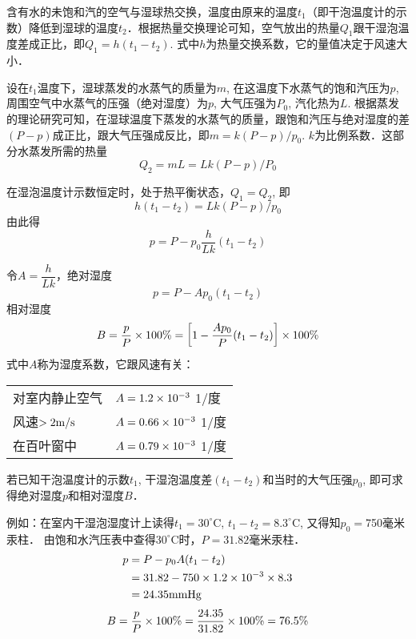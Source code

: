 含有水的未饱和汽的空气与湿球热交换，温度由原来的温度$t_1$（即干泡温度计的示数）降低到湿球的温度$t_2$．根据热量交换理论可知，空气放出的热量$Q_1$跟干湿泡温度差成正比，即$Q_1=h(t_1-t_2)$. 式中$h$为热量交换系数，它的量值决定于风速大小．

设在$t_1$温度下，湿球蒸发的水蒸气的质量为$m$, 在这温度下水蒸气的饱和汽压为$p$, 周围空气中水蒸气的压强（绝对湿度）为$p$, 大气压强为$P_0$, 汽化热为$L$. 根据蒸发的理论研究可知，在湿球温度下蒸发的水蒸气的质量，跟饱和汽压与绝对湿度的差$(P-p)$成正比，跟大气压强成反比，即$m=k(P-p)/p_0$. $k$为比例系数．这部分水蒸发所需的热量
\[Q_2=mL=Lk (P-p) /P_0\]

在湿泡温度计示数恒定时，处于热平衡状态，$Q_1=Q_2$, 即
\[h (t_1-t_2) =Lk (P-p) /p_0\]
由此得
\[p=P-p_0 \frac{h}{Lk} (t_1-t_2) \]

令$A=\dfrac{h}{Lk}$，绝对湿度
\[p=P-Ap_0(t_1-t_2)\]
相对湿度
\[B=\frac{p}{P}\times 100\%=\left[1-\frac{Ap_0}{P}(t_1-t_2)\right]\times 100\%\]
式中$A$称为湿度系数，它跟风速有关：
\begin{center}
  \begin{tabular}{p{}l}
    对室内静止空气& $A=1.2\times10^{-3}$ 1/度\\
风速$>2{\rm m/s}$& $A=0.66\times10^{-3}$ 1/度\\
在百叶窗中&  $A=0.79\times10^{-3}$ 1/度
  \end{tabular}
\end{center}

若已知干泡温度计的示数$t_1$, 干湿泡温度差$(t_1-t_2)$和当时的大气压强$p_0$, 即可求得绝对湿度$p$和相对湿度$B$．

例如：在室内干湿泡湿度计上读得$t_1=30^{\circ}$C, $t_1-t_2=8.3^{\circ}$C, 又得知$p_0=$750毫米汞柱．
由饱和水汽压表中查得$30^{\circ}$C时，$P=31.82$毫米汞柱．
\[\begin{split}
  p&=P-p_0A(t_1-t_2)\\
  &=31.82-750\times 1.2\times 10^{-3}\times 8.3\\
  &=24.35{\rm mmHg}
\end{split}\]
\[B=\frac{p}{P}\times100\%=\frac{24.35}{31.82}\times100\%=76.5\%\]

